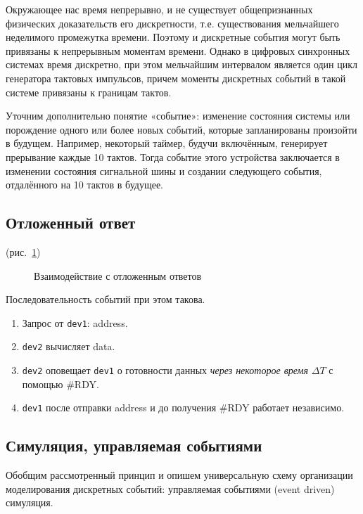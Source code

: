 Окружающее нас время непрерывно, и не существует общепризнанных физических доказательств его дискретности, т.е. существования мельчайшего неделимого промежутка времени. Поэтому и дискретные события могут быть привязаны к непрерывным моментам времени. Однако в цифровых синхронных системах время дискретно, при этом мельчайшим интервалом является один цикл генератора тактовых импульсов, причем моменты дискретных событий в такой системе привязаны к границам тактов.

Уточним дополнительно понятие «событие»: изменение состояния системы или порождение одного или более новых событий, которые запланированы произойти в будущем. Например, некоторый таймер, будучи включённым, генерирует прерывание каждые 10 тактов. Тогда событие этого устройства заключается в изменении состояния сигнальной шины и создании следующего события, отдалённого на 10 тактов в будущее.

\subsection{Отложенный ответ}


(рис.~\ref{fig:delayed-response})

\begin{figure}[htp]
    \centering
    \caption[Взаимодействие с отложенным ответов]{Взаимодействие с отложенным ответов}
    \label{fig:delayed-response}
\end{figure}

Последовательность событий при этом такова.
\begin{enumerate}
    \item Запрос от \texttt{dev1}: address.
    \item \texttt{dev2} вычисляет data.
    \item \texttt{dev2} оповещает \texttt{dev1} о готовности данных \textit{через некоторое время} $\Delta T$ с помощью \#RDY.
    \item \texttt{dev1} после отправки address и до получения \#RDY работает независимо.
\end{enumerate}


\subsection{Симуляция, управляемая событиями}

Обобщим рассмотренный принцип и опишем универсальную схему организации моделирования дискретных событий: управляемая событиями (\abbr event driven) симуляция.


